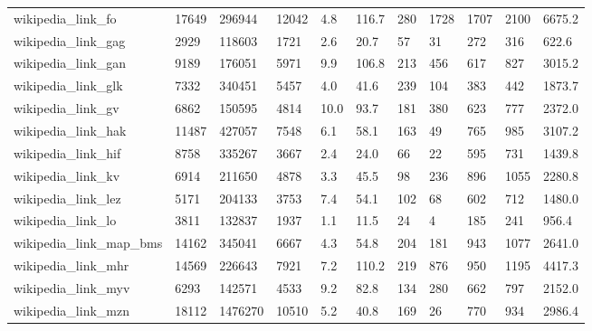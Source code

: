 \begin{longtable}{lllllllllll}
 wikipedia\_link\_fo                                  & 17649      & 296944    & 12042 & 4.8    & 116.7  & 280   & 1728   & 1707   & 2100   & 6675.2  \\
 wikipedia\_link\_gag                                 & 2929       & 118603    & 1721  & 2.6    & 20.7   & 57    & 31     & 272    & 316    & 622.6   \\
 wikipedia\_link\_gan                                 & 9189       & 176051    & 5971  & 9.9    & 106.8  & 213   & 456    & 617    & 827    & 3015.2  \\
 wikipedia\_link\_glk                                 & 7332       & 340451    & 5457  & 4.0    & 41.6   & 239   & 104    & 383    & 442    & 1873.7  \\
 wikipedia\_link\_gv                                  & 6862       & 150595    & 4814  & 10.0   & 93.7   & 181   & 380    & 623    & 777    & 2372.0  \\
 wikipedia\_link\_hak                                 & 11487      & 427057    & 7548  & 6.1    & 58.1   & 163   & 49     & 765    & 985    & 3107.2  \\
 wikipedia\_link\_hif                                 & 8758       & 335267    & 3667  & 2.4    & 24.0   & 66    & 22     & 595    & 731    & 1439.8  \\
 wikipedia\_link\_kv                                  & 6914       & 211650    & 4878  & 3.3    & 45.5   & 98    & 236    & 896    & 1055   & 2280.8  \\
 wikipedia\_link\_lez                                 & 5171       & 204133    & 3753  & 7.4    & 54.1   & 102   & 68     & 602    & 712    & 1480.0  \\
 wikipedia\_link\_lo                                  & 3811       & 132837    & 1937  & 1.1    & 11.5   & 24    & 4      & 185    & 241    & 956.4   \\
 wikipedia\_link\_map\_bms                             & 14162      & 345041    & 6667  & 4.3    & 54.8   & 204   & 181    & 943    & 1077   & 2641.0  \\
 wikipedia\_link\_mhr                                 & 14569      & 226643    & 7921  & 7.2    & 110.2  & 219   & 876    & 950    & 1195   & 4417.3  \\
 wikipedia\_link\_myv                                 & 6293       & 142571    & 4533  & 9.2    & 82.8   & 134   & 280    & 662    & 797    & 2152.0  \\
 wikipedia\_link\_mzn                                 & 18112      & 1476270   & 10510 & 5.2    & 40.8   & 169   & 26     & 770    & 934    & 2986.4  \\

\end{longtable}
